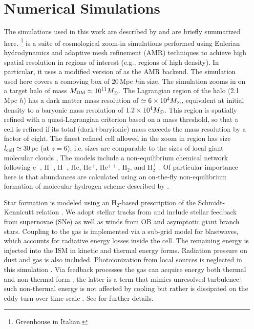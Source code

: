 \IfFileExists{emulateapjlegacy.cls}{\documentclass[iop]{emulateapjlegacy}}{\documentclass[iop]{emulateapj}}
\begin{document}
\section{Numerical Simulations}\label{sec:sim}
The simulations used in this work are described by \citealt{Pallottini17a, Pallottini17b} and are briefly summarized here.
%
\footnote{Greenhouse in Italian.} is a suite of cosmological zoom-in simulations performed using Eulerian hydrodynamics and adaptive mesh refinement (AMR) techniques to achieve high spatial resolution in regions of interest (e.g., regions of high density).
%
In particular, it uses a modified version of  \citep{Teyssier02a} as the AMR backend. The simulation used here covers a comoving box of 20\,Mpc $h$\pmOne in size. The simulation zooms in on a target halo of mass $M_{\rm DM}\simeq10^{11} \mbox{$M_{\odot}$}$. The Lagrangian region of the halo (2.1\,Mpc $h$\pmOne) has a dark matter mass resolution of $\simeq 6\times 10^4 \mbox{$M_{\odot}$}$, equivalent at initial density to a baryonic mass resolution of $1.2 \times 10^4 \mbox{$M_{\odot}$}$. This region is spatially refined with a quasi-Lagrangian criterion based on a mass threshold, so that a cell is refined if its total (dark+baryionic) mass exceeds the mass resolution by a factor of eight. The finest refined cell allowed in the zoom in region has size $l_{\rm cell}\simeq$\,30\,pc (at $z = 6$), i.e. sizes are comparable to the sizes of local giant molecular clouds \citep[e.g.,][]{Sanders85a, Federrath13a, Goodman14a},
The models include a non-equilibrium chemical network following e$^{-}$, H$^+$, H$^-$, He, He$^+$, He$^{++}$, H$_2$, and H$_2^+$ \citep{Grassi14a,Bovino16a}. Of particular importance here is that abundances are calculated using an on-the-fly non-equilibrium formation of molecular hydrogen scheme described by \citet{Pallottini17a}.

Star formation is modeled using an H$_2$-based prescription of the Schmidt-Kennicutt relation \citep{Krumholz09a}. We adopt stellar tracks from  and include stellar feedback from supernovae (SNe) as well as winds from OB and asymptotic giant branch stars. Coupling to the gas is implemented via a sub-grid model for blastwaves, which accounts for radiative energy losses inside the cell. The remaining energy is injected into the ISM in kinetic and thermal energy forms. Radiation pressure on dust and gas is also included. Photoionization from local sources is neglected in this simulation \citep[see][for its effect]{Pallottini19a, Decataldo19a}.
%
Via feedback processes the gas can acquire energy both thermal and non-thermal form \citep{Agertz13a}; the latter is a term that mimics unresolved turbulence: such non-thermal energy is not affected by cooling but rather is dissipated on the eddy turn-over time scale \citep{Maclow99a}. See \citet{Pallottini17b} for further details.
\end{document}

